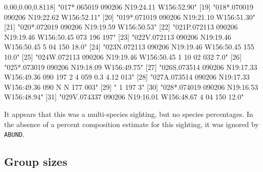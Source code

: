 \documentclass[
]{book}
\newenvironment{Shaded}{\begin{snugshade}}{\end{snugshade}}
\newcommand{\DecValTok}[1]{\textcolor[rgb]{0.00,0.00,0.81}{#1}}
\newcommand{\NormalTok}[1]{#1}
\newcommand{\StringTok}[1]{\textcolor[rgb]{0.31,0.60,0.02}{#1}}
\begin{document}
\begin{Shaded}
\begin{Highlighting}[]
\NormalTok{[}\DecValTok{18}\NormalTok{] }\StringTok{"017*.065019 090206 N19:24.11 W156:52.90"}                                               
\NormalTok{[}\DecValTok{19}\NormalTok{] }\StringTok{"018*.070019 090206 N19:22.62 W156:52.11"}                                               
\NormalTok{[}\DecValTok{20}\NormalTok{] }\StringTok{"019*.071019 090206 N19:21.10 W156:51.30"}                                               
\NormalTok{[}\DecValTok{21}\NormalTok{] }\StringTok{"020*.072019 090206 N19:19.59 W156:50.53"}                                               
\NormalTok{[}\DecValTok{22}\NormalTok{] }\StringTok{"021P.072113 090206 N19:19.46 W156:50.45  073  196  197"}                                
\NormalTok{[}\DecValTok{23}\NormalTok{] }\StringTok{"022V.072113 090206 N19:19.46 W156:50.45    5   04  150      18.0"}                      
\NormalTok{[}\DecValTok{24}\NormalTok{] }\StringTok{"023N.072113 090206 N19:19.46 W156:50.45  155 10.0"}                                     
\NormalTok{[}\DecValTok{25}\NormalTok{] }\StringTok{"024W.072113 090206 N19:19.46 W156:50.45    1   10   02  032  7.0"}                      
\NormalTok{[}\DecValTok{26}\NormalTok{] }\StringTok{"025*.073019 090206 N19:18.09 W156:49.75"}                                               
\NormalTok{[}\DecValTok{27}\NormalTok{] }\StringTok{"026S.073514 090206 N19:17.33 W156:49.36  090  197    2    4  059  0.3 4.12  013"}       
\NormalTok{[}\DecValTok{28}\NormalTok{] }\StringTok{"027A.073514 090206 N19:17.33 W156:49.36  090         N    N  177  003"}                 
\NormalTok{[}\DecValTok{29}\NormalTok{] }\StringTok{"   1                                     197              3"}                           
\NormalTok{[}\DecValTok{30}\NormalTok{] }\StringTok{"028*.074019 090206 N19:16.53 W156:48.94"}                                               
\NormalTok{[}\DecValTok{31}\NormalTok{] }\StringTok{"029V.074337 090206 N19:16.01 W156:48.67    4   04  150      12.0"}                      
\end{Highlighting}
\end{Shaded}

It appears that this was a multi-species sighting, but no species percentages. In the absence of a percent composition estimate for this sighting, it was ignored by \texttt{ABUND}.

\hypertarget{group-sizes}{%
\subsection*{Group sizes}\label{group-sizes}}
\end{document}
